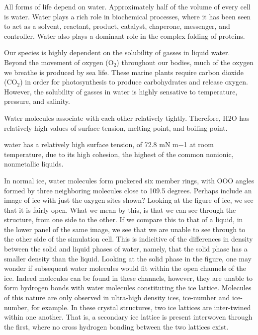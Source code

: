All forms of life depend on water.\cite{5,6} Approximately half of the
volume of every cell is water.\cite{7} Water plays a rich role in
biochemical processes, where it has been seen to act as a solvent,
reactant, product, catalyst, chaperone, messenger, and
controller. Water also plays a dominant role in the complex folding of
proteins.

Our species is highly dependent on the solubility of gasses in liquid
water. Beyond the movement of oxygen (O$_{2}$) throughout
our bodies, much of the oxygen we breathe is produced by sea
life. These marine plants require carbon dioxide
(CO$_{2}$) in order for photosynthesis to produce
carbohydrates and release oxygen. However, the solubility of gasses in
water is highly sensative to temperature, pressure, and salinity. 

Water molecules associate with each other relatively
tightly. Therefore, H2O has relatively high values of surface tension,
melting point, and boiling point.

water has a relatively high surface tension, of 72.8 mN m−1 at room
temperature, due to its high cohesion, the highest of the common
nonionic, nonmetallic liquids.

In normal ice, water molecules form puckered six member rings, with
OOO angles formed by three neighboring molecules close to 109.5
degrees. Perhaps include an image of ice with just the oxygen sites
shown? Looking at the figure of ice, we see that it is fairly
open. What we mean by this, is that we can see through the structure,
from one side to the other. If we compare this to that of a liquid, in
the lower panel of the same image, we see that we are unable to see
through to the other side of the simulation cell. This is indicitive
of the differences in density between the solid and liquid phases of
water, namely, that the solid phase has a smaller density than the
liquid. Looking at the solid phase in the figure, one may wonder if
subsequent water molecules would fit within the open channels of the
ice. Indeed molecules can be found in these channels, however, they
are unable to form hydrogen bonds with water molecules constituting
the ice lattice. Molecules of this nature are only observed in
ultra-high density ices, ice-number and ice-number, for example. In
these crystal structures, two ice lattices are inter-twined within one
another. That is, a secondary ice lattice is present interwoven
through the first, where no cross hydrogen bonding between the two
lattices exist.

